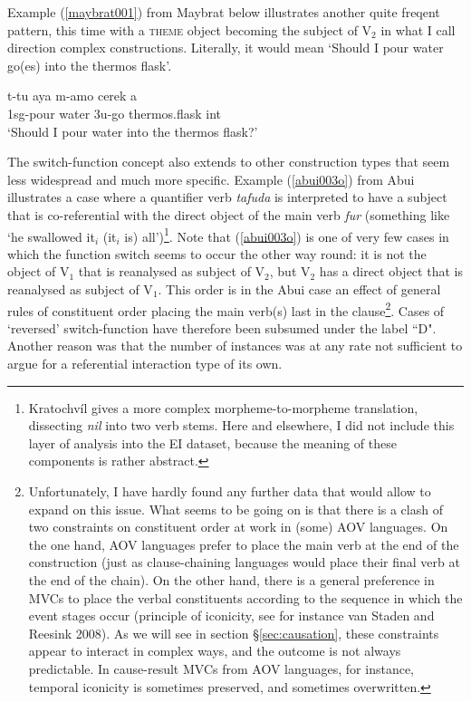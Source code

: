Example (\ref{maybrat001}) from Maybrat below illustrates another quite freqent pattern, this time with a \textsc{theme} object becoming the subject of V$_2$ in what I call direction complex constructions. Literally, it would mean `Should I pour water go(es) into the thermos flask'.

\ea \label{maybrat001}
\gll t-tu aya m-amo cerek a \\
1\acs{sg}-pour water 3\acs{u}-go thermos.flask \acs{int} \\
\glft `Should I pour water into the thermos flask?' \\ 
\z
\xe

The switch-function concept also extends to other construction types that seem less widespread and much more specific. Example (\ref{abui003o}) from Abui illustrates a case where a quantifier verb \textit{tafuda} is interpreted to have a subject that is co-referential with the direct object of the main verb \textit{fur} (something like `he swallowed it$_i$ (it$_i$ is) all')\footnote{Kratochvíl gives a more complex morpheme-to-morpheme translation, dissecting \textit{nil} into two verb stems. Here and elsewhere, I did not include this layer of analysis into the EI dataset, because the meaning of these components is rather abstract.}. Note that (\ref{abui003o}) is one of very few cases in which the function switch seems to occur the other way round: it is not the object of V$_1$ that is reanalysed as subject of V$_2$, but V$_2$ has a direct object that is reanalysed as subject of V$_1$. This order is in the Abui case an effect of general rules of constituent order placing the main verb(s) last in the clause\footnote{Unfortunately, I have hardly found any further data that would allow to expand on this issue. What seems to be going on is that there is a clash of two constraints on constituent order at work in (some) AOV languages. On the one hand, AOV languages prefer to place the main verb at the end of the construction (just as clause-chaining languages would place their final verb at the end of the chain). On the other hand, there is a general preference in MVCs to place the verbal constituents according to the sequence in which the event stages occur (principle of iconicity, see for instance van Staden and Reesink 2008). As we will see in section §\ref{sec:causation}, these constraints appear to interact in complex ways, and the outcome is not always predictable. In cause-result MVCs from AOV languages, for instance, temporal iconicity is sometimes preserved, and sometimes overwritten.}. Cases of `reversed' switch-function have therefore been subsumed under the label ``D". Another reason was that the number of instances was at any rate not sufficient to argue for a referential interaction type of its own.


